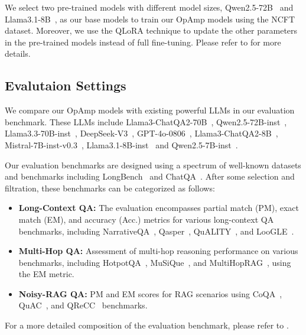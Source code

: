 We select two pre-trained models with different model sizes, Qwen2.5-72B~\cite{yang2024qwen2_5} and Llama3.1-8B~\cite{dubey2024llama3}, as our base models to train our OpAmp models using the NCFT dataset.
Moreover, we use the QLoRA technique to update the other parameters in the pre-trained models instead of full fine-tuning.
Please refer to  for more details.

\subsection{Evalutaion Settings}

We compare our OpAmp models with existing powerful LLMs in our evaluation benchmark.
These LLMs include Llama3-ChatQA2-70B~\cite{xu2024chatqa2}, Qwen2.5-72B-inst~\cite{yang2024qwen2_5}, Llama3.3-70B-inst~\cite{dubey2024llama3}, DeepSeek-V3~\cite{liu2024deepseekv3}, GPT-4o-0806~\cite{hurst2024gpt4o}, Llama3-ChatQA2-8B~\cite{xu2024chatqa2}, Mistral-7B-inst-v0.3~\cite{jiang2023mistral}, Llama3.1-8B-inst~\cite{meta2024llama3_1} and Qwen2.5-7B-inst~\cite{yang2024qwen2_5}.

Our evaluation benchmarks are designed using a spectrum of well-known datasets and benchmarks including LongBench~\cite{bai2024longbench} and ChatQA~\cite{liu2024chatqa}.
After some selection and filtration, these benchmarks can be categorized as follows:
\begin{itemize}[itemsep=0pt,topsep=0pt,parsep=0pt]
    \item \textbf{Long-Context QA:} The evaluation encompasses partial match (PM), exact match (EM), and accuracy (Acc.) metrics for various long-context QA benchmarks, including NarrativeQA~\cite{kovcisky2018narrativeqa}, Qasper~\cite{dasigi2021qasper}, QuALITY~\cite{pang2021quality}, and LooGLE~\cite{li2023loogle}.
    \item \textbf{Multi-Hop QA:} Assessment of multi-hop reasoning performance on various benchmarks, including HotpotQA~\cite{yang2018hotpotqa}, MuSiQue~\cite{trivedi2022musique}, and MultiHopRAG~\cite{tang2024multihoprag}, using the EM metric.
    \item \textbf{Noisy-RAG QA:} PM and EM scores for RAG scenarios using CoQA~\cite{reddy2019coqa}, QuAC~\cite{choi2018quac}, and QReCC~\cite{anantha2020qrecc} benchmarks.
\end{itemize}
For a more detailed composition of the evaluation benchmark, please refer to .

